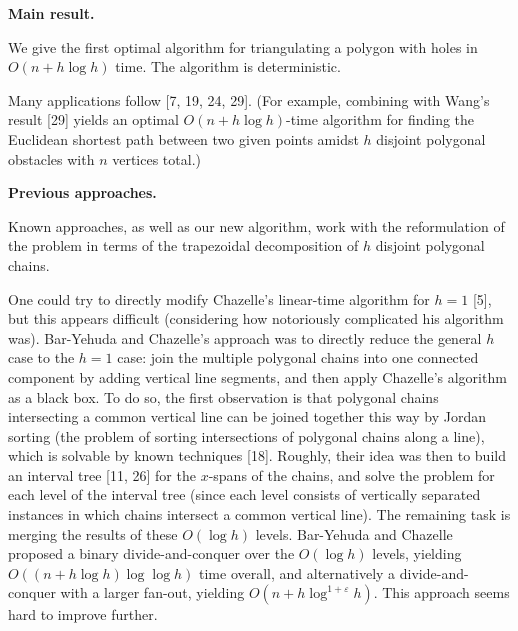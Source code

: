 \par
\par
\par\medskip\noindent\textbf{Main result.}\par
We give the first optimal algorithm for triangulating a polygon with holes in $O(n+h\log h)$ time. The algorithm is deterministic.
\par
\par
Many applications follow [7, 19, 24, 29]. (For example, combining with Wang’s result [29] yields an optimal $O(n+h\log h)$-time algorithm for finding the Euclidean shortest path between two given points amidst $h$ disjoint polygonal obstacles with $n$ vertices total.)
\par
\par
\par\medskip\noindent\textbf{Previous approaches.}\par
Known approaches, as well as our new algorithm, work with the reformulation of the problem in terms of the trapezoidal decomposition of $h$ disjoint polygonal chains.
\par
\par
One could try to directly modify Chazelle’s linear-time algorithm for $h=1$ [5], but this appears difficult (considering how notoriously complicated his algorithm was). Bar-Yehuda and Chazelle’s approach was to directly reduce the general $h$ case to the $h=1$ case: join the multiple polygonal chains into one connected component by adding vertical line segments, and then apply Chazelle’s algorithm as a black box. To do so, the first observation is that polygonal chains intersecting a common vertical line can be joined together this way by Jordan sorting (the problem of sorting intersections of polygonal chains along a line), which is solvable by known techniques [18]. Roughly, their idea was then to build an interval tree [11, 26] for the $x$-spans of the chains, and solve the problem for each level of the interval tree (since each level consists of vertically separated instances in which chains intersect a common vertical line). The remaining task is merging the results of these $O(\log h)$ levels. Bar-Yehuda and Chazelle proposed a binary divide-and-conquer over the $O(\log h)$ levels, yielding $O((n+h\log h)\log\log h)$ time overall, and alternatively a divide-and-conquer with a larger fan-out, yielding $O(n+h\log^{1+\varepsilon}h)$. This approach seems hard to improve further.
